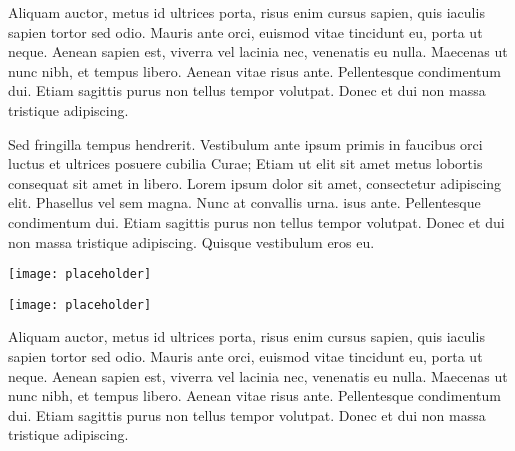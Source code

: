 \documentclass[landscape,a0paper,fontscale=0.285]{baposter} %
\begin{document}
\begin{poster}
{\begin{multicols}{2}
Aliquam auctor, metus id ultrices porta, risus enim cursus sapien, quis iaculis sapien tortor sed odio. Mauris ante orci, euismod vitae tincidunt eu, porta ut neque. Aenean sapien est, viverra vel lacinia nec, venenatis eu nulla. Maecenas ut nunc nibh, et tempus libero. Aenean vitae risus ante. Pellentesque condimentum dui. Etiam sagittis purus non tellus tempor volutpat. Donec et dui non massa tristique adipiscing.
\end{multicols}


\begin{multicols}{2}
\vspace{1em}
Sed fringilla tempus hendrerit. Vestibulum ante ipsum primis in faucibus orci luctus et ultrices posuere cubilia Curae; Etiam ut elit sit amet metus lobortis consequat sit amet in libero. Lorem ipsum dolor sit amet, consectetur adipiscing elit. Phasellus vel sem magna. Nunc at convallis urna. isus ante. Pellentesque condimentum dui. Etiam sagittis purus non tellus tempor volutpat. Donec et dui non massa tristique adipiscing. Quisque vestibulum eros eu.

\begin{center}
\texttt{[image: placeholder]}
\end{center}

\end{multicols}
}



{
\begin{multicols}{2}
\vspace{1em}
\begin{center}
\texttt{[image: placeholder]}
\end{center}

Aliquam auctor, metus id ultrices porta, risus enim cursus sapien, quis iaculis sapien tortor sed odio. Mauris ante orci, euismod vitae tincidunt eu, porta ut neque. Aenean sapien est, viverra vel lacinia nec, venenatis eu nulla. Maecenas ut nunc nibh, et tempus libero. Aenean vitae risus ante. Pellentesque condimentum dui. Etiam sagittis purus non tellus tempor volutpat. Donec et dui non massa tristique adipiscing.
\end{multicols}

}
\end{poster}
\end{document}
